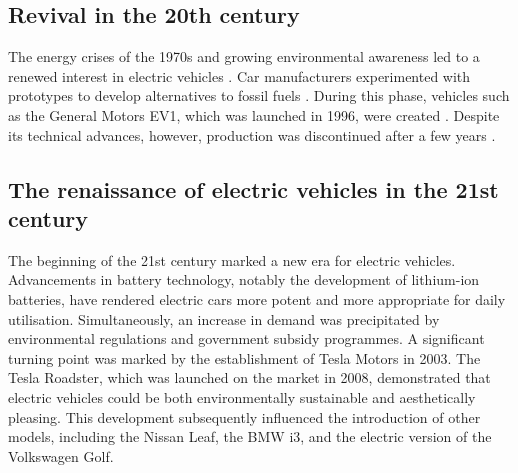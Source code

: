 \subsection*{Revival in the 20th century}

The energy crises of the 1970s and growing environmental awareness led to a renewed interest in electric vehicles \autocite{daswissen_oelkrise_1970er}. %
Car manufacturers experimented with prototypes to develop alternatives to fossil fuels \autocite{energieleben_ev1_geschichte}. %
During this phase, vehicles such as the General Motors EV1, which was launched in 1996, were created \autocite{insideevs_gm_ev1}.
Despite its technical advances, however, production was discontinued after a few years \autocite{energieleben_ev1_geschichte}.

\subsection*{The renaissance of electric vehicles in the 21st century}
The beginning of the 21st century marked a new era for electric vehicles. Advancements in battery technology, notably the development of lithium-ion batteries, have rendered electric cars more potent and more appropriate for daily utilisation.\autocite{sonepar_batterien_2023} 
Simultaneously, an increase in demand was precipitated by environmental regulations and government subsidy programmes.\newline
A significant turning point was marked by the establishment of Tesla Motors in 2003. The Tesla Roadster, which was launched on the market in 2008, demonstrated that electric vehicles could be both environmentally sustainable and aesthetically pleasing. This development subsequently influenced the introduction of other models, including the Nissan Leaf, the BMW i3, and the electric version of the Volkswagen Golf.\autocite{insidetesla_tesla_geschichte}


